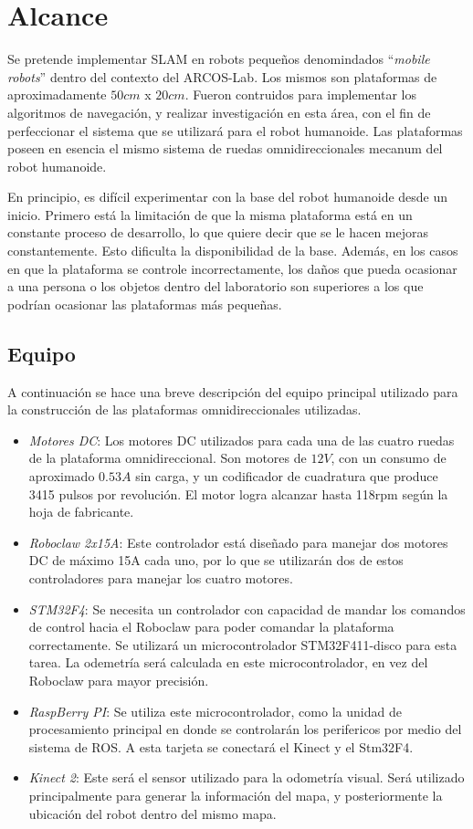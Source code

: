 \newpage
\section{Alcance}
Se pretende implementar SLAM en robots pequeños denomindados ``\textit{mobile robots}'' dentro del contexto del ARCOS-Lab. Los mismos son plataformas de aproximadamente $50cm$ x $20cm$. Fueron contruidos para implementar los algoritmos de navegación, y realizar investigación en esta área, con el fin de perfeccionar el sistema que se utilizará para el robot humanoide. Las plataformas poseen en esencia el mismo sistema de ruedas omnidireccionales mecanum del robot humanoide.

En principio, es difícil experimentar con la base del robot humanoide desde un inicio. Primero está la limitación de que la misma plataforma está en un constante proceso de desarrollo, lo que quiere decir que se le hacen mejoras constantemente. Esto dificulta la disponibilidad de la base. Además, en los casos en que la plataforma se controle incorrectamente, los daños que pueda ocasionar a una persona o los objetos dentro del laboratorio son superiores a los que podrían ocasionar las plataformas más pequeñas.

\subsection{Equipo}
A continuación se hace una breve descripción del equipo principal utilizado para la construcción de las plataformas omnidireccionales utilizadas.

\begin{itemize}
\item \textit{Motores DC}: Los motores DC utilizados para cada una de las cuatro ruedas de la plataforma omnidireccional. Son motores de $12V$, con un consumo de aproximado $0.53A$ sin carga, y un codificador de cuadratura que produce 3415 pulsos por revolución. El motor logra alcanzar hasta 118rpm según la hoja de fabricante.
\item \textit{Roboclaw 2x15A}: Este controlador está diseñado para manejar dos motores DC de máximo 15A cada uno, por lo que se utilizarán dos de estos controladores para manejar los cuatro motores.
\item \textit{STM32F4}: Se necesita un controlador con capacidad de mandar los comandos de control hacia el Roboclaw para poder comandar la plataforma correctamente. Se utilizará un microcontrolador STM32F411-disco para esta tarea. La odemetría será calculada en este microcontrolador, en vez del Roboclaw para mayor precisión.
\item \textit{RaspBerry PI}: Se utiliza este microcontrolador, como la unidad de procesamiento principal en donde se controlarán los perifericos por medio del sistema de ROS. A esta tarjeta se conectará el Kinect y el Stm32F4.
\item \textit{Kinect 2}: Este será el sensor utilizado para la odometría visual. Será utilizado principalmente para generar la información del mapa, y posteriormente la ubicación del robot dentro del mismo mapa. 
\end{itemize}

